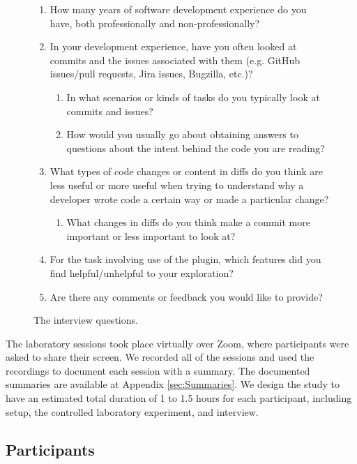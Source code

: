 \begin{figure}[h]
  \begin{mdframed}
    \begin{enumerate}
      \item How many years of software development experience do you have, both professionally and non-professionally?
      \item In your development experience, have you often looked at commits and the issues associated with them (e.g. GitHub issues/pull requests, Jira issues, Bugzilla, etc.)?
          \begin{enumerate}
              \item In what scenarios or kinds of tasks do you typically look at commits and issues?
              \item How would you usually go about obtaining answers to questions about the intent behind the code you are reading?
          \end{enumerate}
      \item What types of code changes or content in diffs do you think are less useful or more useful when trying to understand why a developer wrote code a certain way or made a particular change? 
          \begin{enumerate}
              \item What changes in diffs do you think make a commit more important or less important to look at?
          \end{enumerate}
      \item For the task involving use of the plugin, which features did you find helpful/unhelpful to your exploration?
      \item Are there any comments or feedback you would like to provide?
    \end{enumerate}
\end{mdframed}
  \caption{The interview questions.}
  \label{fig:Interview-Questions}
\end{figure}

The laboratory sessions took place virtually over Zoom, where participants were asked to share their screen.
We recorded all of the sessions and used the recordings to document each session with a summary.
The documented summaries are available at Appendix \ref{sec:Summaries}.
We design the study to have an estimated total duration of 1 to 1.5 hours for each participant,
including setup, the controlled laboratory experiment, and interview.

\subsection{Participants}

